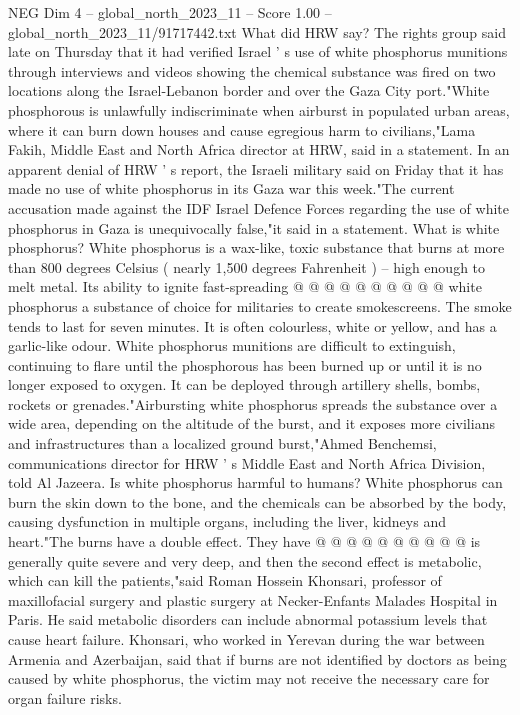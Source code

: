 \begin{textsample}{NEG Dim 4 – global\_north\_2023\_11 – Score 1.00 – global\_north\_2023\_11/91717442.txt}  \label{ex:f4_neg_183}
What did HRW say?
The rights group said late on Thursday that it had verified Israel ' s use of white phosphorus munitions through interviews and videos showing the chemical substance was fired on two locations along the Israel-Lebanon border and over the Gaza City port."White phosphorous is unlawfully indiscriminate when airburst in populated urban areas, where it can burn down houses and cause egregious harm to civilians,"Lama Fakih, Middle East and North Africa director at HRW, said in a statement.
In an apparent denial of HRW ' s report, the Israeli military said on Friday that it has made no use of white phosphorus in its Gaza war this week."The current accusation made against the IDF Israel Defence Forces regarding the use of white phosphorus in Gaza is unequivocally false,"it said in a statement.
What is white phosphorus?
White phosphorus is a wax-like, toxic substance that burns at more than 800 degrees Celsius ( nearly 1,500 degrees Fahrenheit ) -- high enough to melt metal.
Its ability to ignite fast-spreading @ @ @ @ @ @ @ @ @ @ white phosphorus a substance of choice for militaries to create smokescreens.
The smoke tends to last for seven minutes.
It is often colourless, white or yellow, and has a garlic-like odour.
White phosphorus munitions are difficult to extinguish, continuing to flare until the phosphorous has been burned up or until it is no longer exposed to oxygen.
It can be deployed through artillery shells, bombs, rockets or grenades."Airbursting white phosphorus spreads the substance over a wide area, depending on the altitude of the burst, and it exposes more civilians and infrastructures than a localized ground burst,"Ahmed Benchemsi, communications director for HRW ' s Middle East and North Africa Division, told Al Jazeera.
Is white phosphorus harmful to humans?
White phosphorus can burn the skin down to the bone, and the chemicals can be absorbed by the body, causing dysfunction in multiple organs, including the liver, kidneys and heart."The burns have a double effect.
They have @ @ @ @ @ @ @ @ @ @ is generally quite severe and very deep, and then the second effect is metabolic, which can kill the patients,"said Roman Hossein Khonsari, professor of maxillofacial surgery and plastic surgery at Necker-Enfants Malades Hospital in Paris.
He said metabolic disorders can include abnormal potassium levels that cause heart failure.
Khonsari, who worked in Yerevan during the war between Armenia and Azerbaijan, said that if burns are not identified by doctors as being caused by white phosphorus, the victim may not receive the necessary care for organ failure risks.

\end{textsample}
